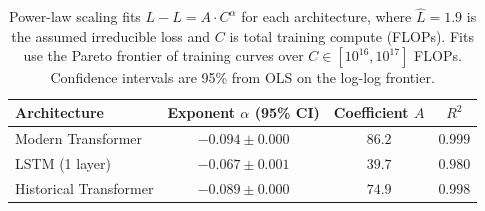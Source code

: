 \begin{table}[h]
\centering
\begin{tabular}{lccc}
\toprule
Architecture & Exponent $\alpha$ (95\% CI) & Coefficient $A$ & $R^2$ \\
\midrule
Modern Transformer & $-0.094 \pm 0.000$ & $86.2$ & $0.999$ \\
LSTM (1 layer) & $-0.067 \pm 0.001$ & $39.7$ & $0.980$ \\
Historical Transformer & $-0.089 \pm 0.000$ & $74.9$ & $0.998$ \\
\bottomrule
\end{tabular}
\caption{Power-law scaling fits $L - \hat{L} = A \cdot C^{\alpha}$ for each architecture, where $\hat{L} = 1.9$ is the assumed irreducible loss and $C$ is total training compute (FLOPs). Fits use the Pareto frontier of training curves over $C \in [10^{16}, 10^{17}]$ FLOPs. Confidence intervals are 95\% from OLS on the log-log frontier.}
\label{tab:scaling_fits}
\end{table}